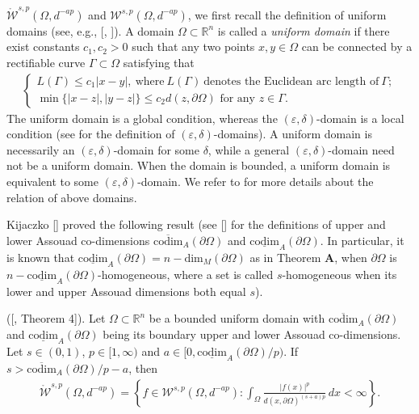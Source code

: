 \documentclass[11pt,twoside]{article}
\def\rn{{\mathbb{R}^n}}
\def\bgz{{\Gamma}}
\def\boz{{\Omega}}
\def\vez{\varepsilon}
\def\pa{\partial}                %
\theoremstyle{mylem}
\theoremstyle{definition}
\numberwithin{equation}{section}
\begin{document}
$\mathring{\mathcal{W}}^{s,p}(\boz,d^{-ap})$
and $\mathcal{W}^{s,p}(\boz,d^{-ap})$,
we first recall the definition of uniform domains (see, e.g., [\cite{go1979}, \cite{v1988}]).
A domain \(\boz\subset\rn\) is called a \emph{uniform domain} if there exist constants 
\(c_1,c_2>0\) such that any two points \(x,y\in\boz\) can be connected by a rectifiable curve \(\bgz\subset\boz\) satisfying that
\begin{align*}
\begin{cases}
L(\bgz)\leq c_1 |x-y|, \ \text{where} \ L(\bgz)\ \text{denotes the Euclidean arc length of}\ \bgz;  \\
\min\{|x-z|,|y-z|\}\leq c_2 d(z,\pa\boz)\text{ for any } z\in\bgz.
\end{cases}
\end{align*}
The uniform domain is a global condition, whereas the \((\vez,\delta)\)-domain is a local condition (see \cite{j1981} for the definition of \((\vez,\delta)\)-domains). A uniform domain is necessarily an \((\vez,\delta)\)-domain for some \(\delta\), while a general \((\vez,\delta)\)-domain need not be a uniform domain. When the domain is bounded, a uniform domain is equivalent to some \((\vez,\delta)\)-domain.
We refer to \cite{j1981} for more details about the relation of
above domains.

Kijaczko [\cite{k2023}] proved the following result
(see [\cite{klv2013}] for the definitions of upper and lower Assouad co-dimensions $\overline{\mathrm{codim}}_A(\partial\Omega)$
and $\underline{\mathrm{codim}}_A(\partial\Omega)$.
In particular, it is known that
$\underline{\mathrm{codim}}_A(\partial\Omega)=n-\mathrm{dim}_M(\partial\Omega)$ as in 
Theorem {\bf A}, when $\partial \Omega$ is $n-\underline{\mathrm{codim}}_A(\partial\Omega)$-homogeneous, where a set is called $s$-homogeneous when its lower and upper Assouad dimensions both equal $s$).

\medskip
{ ([\cite{k2023}, Theorem 4]).  Let $\Omega\subset\mathbb{R}^n$ be a 
bounded uniform domain with $\overline{\mathrm{codim}}_A(\partial\Omega)$ and $\underline{\mathrm{codim}}_A(\partial\Omega)$
being its boundary upper and lower Assouad co-dimensions.
Let $s\in(0,1)$,  $p\in[1,\infty)$ and $a\in[0, \underline{\mathrm{codim}}_A(\partial\Omega)/p)$. 
If $s> \overline{\mathrm{codim}}_A(\partial\Omega)/p-a$,
then
\begin{align*}
\mathring{\mathcal{W}}^{s,p}(\boz,d^{-ap}) = \left\{ f\in \mathcal{W}^{s,p}(\boz,d^{-ap}):
\int_\Omega \frac{|f(x)|^p}{d(x,\pa\boz)^{(s+a)p}}\,dx < \infty \right\}.
\end{align*}
}
\end{document}
